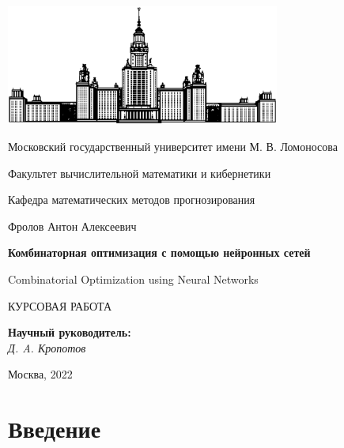 \documentclass[12pt]{article}
\begin{document}
\begin{titlepage}
\begin{center}

    \includegraphics[width=9cm]{msu.eps}

    \bigskip

    Московский государственный университет имени М. В. Ломоносова

    Факультет вычислительной математики и кибернетики

    Кафедра математических методов прогнозирования

    \vspace{1.5cm}

    {\large Фролов Антон Алексеевич}

    \vspace{1.5cm}

    \textbf{\LARGE Комбинаторная оптимизация с помощью нейронных сетей}

    \vspace{0.5cm}

    {\Large{Combinatorial Optimization using Neural Networks}}

    \vspace{1.5cm}

    {\large КУРСОВАЯ РАБОТА}

    \vspace{1.5cm}

    \begin{flushright}
        \parbox{0.4\textwidth}{
            \textbf{Научный руководитель:}\\
            \emph{Д. A. Кропотов}
        }
    \end{flushright}

    \vspace{\fill}
    Москва, 2022
\end{center}
\end{titlepage}

\newpage
\tableofcontents
\newpage

\section{Введение}
\end{document}
